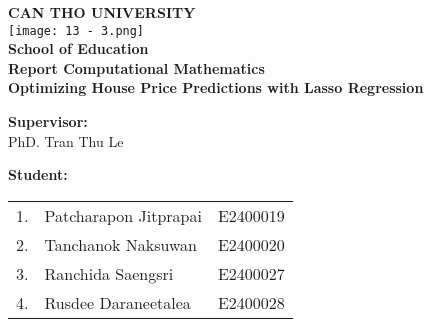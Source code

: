 \documentclass[12pt, a4paper]{report}
\begin{document}
\begin{titlepage}
    \begin{center}
        \textbf{\LARGE CAN THO UNIVERSITY}\\
        \vspace{2cm}
        \texttt{[image: 13 - 3.png]} \\
        \vspace{1cm}
        \textbf{\Large School of Education}\\
        \vspace{0.5cm}
        {\Large \textbf{Report Computational Mathematics}}
        \vspace{2cm}\\
        {\Huge \textbf{Optimizing House Price Predictions with Lasso Regression}}
    \end{center}
\vspace{1cm}
\noindent
\begin{minipage}[l]{0.45\linewidth}
    \textbf{Supervisor:} \\
     PhD. Tran Thu Le
\end{minipage}
\hfill
\begin{minipage}[l]{0.45\linewidth}
    \textbf{Student:} \\
     \begin{tabular}{lll}
     1. & Patcharapon Jitprapai\phantom{h} & E2400019 \\
    2. & Tanchanok Naksuwan & E2400020 \\
    3. & Ranchida Saengsri & E2400027 \\
    4. & Rusdee Daraneetalea & E2400028 \\
\end{tabular}\\
\end{minipage}\\          
\end{titlepage}
\end{document}
